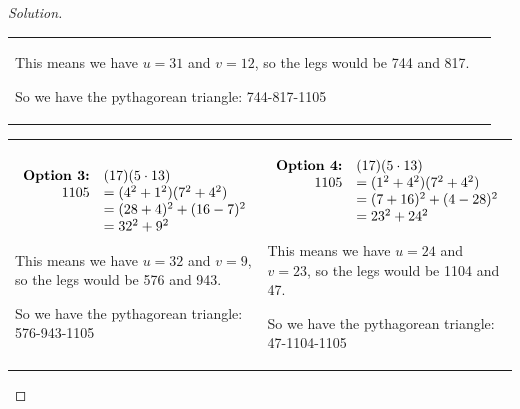 \documentclass[11pt]{article}
\newenvironment{solution}
  {\renewcommand\qedsymbol{$~$}\begin{proof}[Solution]$ $\par\nobreak\ignorespaces}
  {\end{proof}}
\begin{document}
\begin{solution}
\begin{center}
\begin{NiceTabular}[width=0.95\textwidth]{X[l] !{\qquad} X[l]}
      This means we have $u=31$ and $v=12$, so the legs would be 744 and 817.

      So we have the pythagorean triangle:
      744-817-1105
      \\
    \end{NiceTabular}
  \end{center}


  \begin{center}
    \begin{NiceTabular}[width=0.95\textwidth]{X[l] !{\qquad} X[l]}
      \begin{math}
        \begin{array}[t]{rl}
          \textbf{Option 3:} & (17)(5\cdot 13)       \\
          1105               & =  (4^2+1^2)(7^2+4^2) \\
                             & = (28+4)^2 + (16-7)^2 \\
                             & = 32^2 + 9^2
        \end{array}
      \end{math}

      This means we have $u=32$ and $v=9$, so the legs would be 576 and 943.

      So we have the pythagorean triangle:
      576-943-1105

       &
      \begin{math}
        \begin{array}[t]{rl}
          \textbf{Option 4:} & (17)(5\cdot 13)       \\
          1105               & =  (1^2+4^2)(7^2+4^2) \\
                             & = (7+16)^2 + (4-28)^2 \\
                             & = 23^2 + 24^2         \\
        \end{array}
      \end{math}

      This means we have $u=24$ and $v=23$, so the legs would be 1104 and 47.

      So we have the pythagorean triangle:
      47-1104-1105

      \\
    \end{NiceTabular}
  \end{center}



\end{solution}
\end{document}
